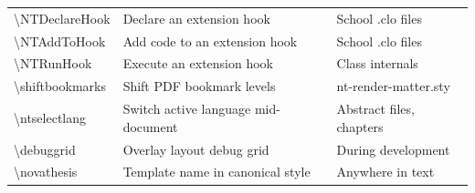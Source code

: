\begin{xltabular}{\linewidth}{@{}
    >{\ttfamily}l
    >{\raggedright\arraybackslash}X
    >{\ttfamily\small}l
  @{}}
  \textbackslash NTDeclareHook & Declare an extension hook & School .clo files \\
  \textbackslash NTAddToHook & Add code to an extension hook & School .clo files \\
  \textbackslash NTRunHook & Execute an extension hook & Class internals \\
  \textbackslash shiftbookmarks & Shift \gls{PDF} bookmark levels & nt-render-matter.sty \\
  \textbackslash ntselectlang & Switch active language mid-document & Abstract files, chapters \\
  \textbackslash debuggrid & Overlay layout debug grid & During development \\
  \textbackslash novathesis & Template name in canonical style & Anywhere in text \\
\end{xltabular}
\egroup

